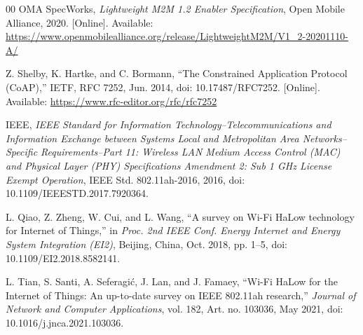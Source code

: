 \documentclass[conference]{IEEEtran}
\begin{document}
\begin{thebibliography}{00}
 OMA SpecWorks, \emph{Lightweight M2M 1.2 Enabler Specification}, Open Mobile Alliance, 2020. [Online]. Available:  \url{https://www.openmobilealliance.org/release/LightweightM2M/V1_2-20201110-A/}

Z. Shelby, K. Hartke, and C. Bormann, ``The Constrained Application Protocol (CoAP),'' IETF, RFC 7252, Jun. 2014, doi: 10.17487/RFC7252. [Online]. Available: \url{https://www.rfc-editor.org/rfc/rfc7252}

IEEE, \emph{IEEE Standard for Information Technology--Telecommunications and Information Exchange between Systems Local and Metropolitan Area Networks--Specific Requirements--Part 11: Wireless LAN Medium Access Control (MAC) and Physical Layer (PHY) Specifications Amendment 2: Sub 1 GHz License Exempt Operation}, IEEE Std. 802.11ah-2016, 2016, doi: 10.1109/IEEESTD.2017.7920364.

L. Qiao, Z. Zheng, W. Cui, and L. Wang, ``A survey on Wi-Fi HaLow technology for Internet of Things,'' in \emph{Proc. 2nd IEEE Conf. Energy Internet and Energy System Integration (EI2)}, Beijing, China, Oct. 2018, pp. 1--5, doi: 10.1109/EI2.2018.8582141.

L. Tian, S. Santi, A. Seferagi\'c, J. Lan, and J. Famaey, ``Wi-Fi HaLow for the Internet of Things: An up-to-date survey on IEEE 802.11ah research,'' \emph{Journal of Network and Computer Applications}, vol. 182, Art. no. 103036, May 2021, doi: 10.1016/j.jnca.2021.103036.

\end{thebibliography}
\end{document}
